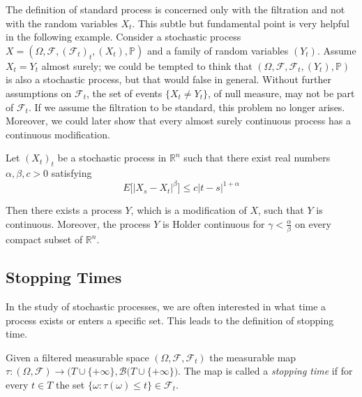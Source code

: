The definition of standard process is concerned only with the filtration and not with the random variables $X_t$. This subtle but fundamental point is very helpful in the following example. Consider a stochastic process $X = (\Omega, \mathcal{F}, (\mathcal{F}_t)_t, (X_t), \mathbb{P})$ and a family of random variables $(Y_t)$. Assume $X_t = Y_t$ almost surely; we could be tempted to think that $(\Omega, \mathcal{F}, \mathcal{F}_t,(Y_t), \mathbb{P})$ is also a stochastic process, but that would false in general. Without further assumptions on $\mathcal{F}_t$, the set of events $\{ X_t \neq Y_t \}$, of null measure, may not be part of $\mathcal{F}_t$. If we assume the filtration to be standard, this problem no longer arises. Moreover, we could later show that every almost surely continuous process has a continuous modification.

\begin{theorem}
    Let $(X_t)_t$ be a stochastic process in $\mathbb{R}^n$ such that there exist real numbers $\alpha, \beta, c > 0$ satisfying
    \begin{equation}
        E\Big[ \Big\vert X_s - X_t \Big\vert^{\beta} \Big] \leq c \big\vert t-s\big\vert^{1+\alpha}
    \end{equation}

    Then there exists a process $Y$, which is a modification of $X$, such that $Y$ is continuous. Moreover, the process $Y$ is Holder continuous for $\gamma < \frac{\alpha}{\beta}$ on every compact subset of $\mathbb{R}^n$. 
\end{theorem}

\subsection{Stopping Times}
In the study of stochastic processes, we are often interested in what time a process exists or enters a specific set. This leads to the definition of stopping time. 

\begin{definition}
    Given a filtered measurable space $(\Omega, \mathcal{F}, \mathcal{F}_t)$ the measurable map $\tau : (\Omega, \mathcal{F}) \to \Big(T \cup \{+\infty\}, \mathcal{B}(T \cup \{+\infty\} \Big)$. The map is called a \textit{stopping time} if for every $t \in T$ the set $\big\{  \omega : \tau(\omega) \leq t \big\} \in \mathcal{F}_t$. 
\end{definition}

